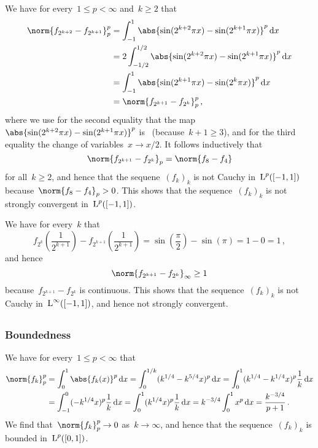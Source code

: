 We have for every~$1 \leq p < \infty$ and~$k \geq 2$ that
\begin{align*}
      \norm{f_{2^{k+2}} - f_{2^{k+1}}}_p^p
  &=  \int_{-1}^1 \abs{ \sin(2^{k+2} \pi x) - \sin(2^{k+1} \pi x) }^p \dd{x}  \\
  &=  2 \int_{-1/2}^{1/2} \abs{ \sin(2^{k+2} \pi x) - \sin(2^{k+1} \pi x) }^p \dd{x}  \\
  &=  \int_{-1}^1 \abs{ \sin(2^{k+1} \pi x) - \sin(2^k \pi x) }^p \dd{x}  \\
  &=  \norm{f_{2^{k+1}} - f_{2^k}}_p^p \,,
\end{align*}
where we use for the second equality that the map~$\abs{\sin(2^{k+2} \pi x) - \sin(2^{k+1} \pi x)}^p$ is~ (because~$k+1 \geq 3$), and for the third equality the change of variables~$x \to x/2$.
It follows inductively that
\[
    \norm{f_{2^{k+1}} - f_{2^k}}_p
  = \norm{f_8 - f_4}
\]
for all~$k \geq 2$, and hence that the sequene~$(f_k)_k$ is not Cauchy in~$\operatorname{L}^p([-1,1])$ because~$\norm{f_8 - f_4}_p > 0$.
This shows that the sequence~$(f_k)_k$ is not strongly convergent in~$\operatorname{L}^p([-1,1])$.

We have for every~$k$ that
\[
      f_{2^k}\left( \frac{1}{2^{k+1}} \right)
    - f_{2^{k+1}}\left( \frac{1}{2^{k+1}} \right)
  =   \sin\left( \frac{\pi}{2} \right)
    - \sin(\pi)
  = 1 - 0
  = 1 \,,
\]
and hence
\[
        \norm{ f_{2^{k+1}} - f_{2^k} }_\infty
  \geq  1
\]
because~$f_{2^{k+1}} - f_{2^k}$ is continuous.
This shows that the sequence~$(f_k)_k$ is not Cauchy in~$\operatorname{L}^\infty([-1,1])$, and hence not strongly convergent.





\subsection{}


\subsubsection{Boundedness}

We have for every~$1 \leq p < \infty$ that
\begin{align*}
      \norm{f_k}_p^p
  &=  \int_0^1 \abs{f_k(x)}^p \dd{x}
   =  \int_0^{1/k} ( k^{1/4} - k^{5/4} x )^p \dd{x}
   =  \int_0^1 ( k^{1/4} - k^{1/4} x )^p \frac{1}{k} \dd{x} \\
  &=  \int_{-1}^0 (-k^{1/4} x)^p \frac{1}{k} \dd{x}
   =  \int_0^1 (k^{1/4} x)^p \frac{1}{k} \dd{x}
   =  k^{-3/4} \int_0^1 x^p \dd{x}
   =  \frac{k^{-3/4}}{p+1} \,.
\end{align*}
We find that~$\norm{f_k}_p^p \to 0$ as~$k \to \infty$, and hence that the sequence~$(f_k)_k$ is bounded in~$\operatorname{L}^p([0,1])$.

